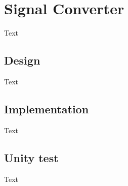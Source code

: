 \section{Signal Converter}
Text

\subsection{Design}
Text

\subsection{Implementation}
Text

\subsection{Unity test}
Text